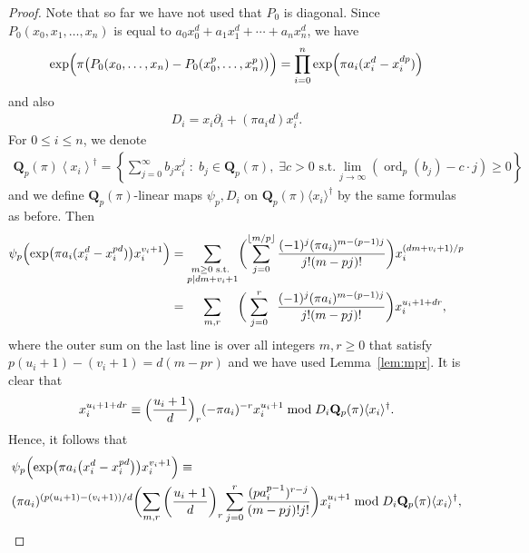 \documentclass[a4paper,11pt]{article}
\numberwithin{equation}{section}
\providecommand{\floor}[1]{\left\lfloor#1\right\rfloor}   %
\newcommand{\QQ}{\mathbf{Q}} %
\DeclareMathOperator{\ord}{ord}          %
\theoremstyle{definition}
\begin{document}
\begin{proof}
Note that so far we have not used that $P_0$ is diagonal. Since
$P_0(x_0, x_1, \dotsc, x_n)$ is equal to $a_0 x_0^d + a_1 x_1^d + \dotsb + a_n x_n^d$,
we have
\begin{align*}
\exp \Bigl(\pi \bigl(P_0(x_0,\ldots,x_n)- P_0(x_0^p,\ldots,x_n^p)\bigl) \Bigr) 
    = \prod_{i=0}^n \exp \Bigl( \pi a_i (x_i^d - x_i^{dp}) \Bigr)
\end{align*}
and also
\begin{align*}
D_i =x_i \partial_i + (\pi a_i d) x_i^d. 
\end{align*}
For $0 \leq i \leq n$, we denote
\begin{align*}
\QQ_p(\pi) \left\langle x_i \right\rangle^{\dag} =  \left\{ \sum_{j=0}^{\infty} b_j x_i^{j} \; : \; 
b_{j} \in \QQ_p(\pi), \; \exists c > 0 \text{ s.t.}  
\lim_{j \rightarrow \infty} \left(\ord_p(b_j) - c \cdot j \right) \geq 0 \right\}
\end{align*}
and we define $\QQ_p(\pi)$-linear maps $\psi_p, D_i$ on $\QQ_p(\pi) \langle x_i \rangle^{\dag}$ 
by the same formulas as before. Then
\begin{align*}
\psi_p \Bigl( \exp \bigl(\pi a_i(x_i^d- x_i^{pd})\bigr) x_i^{v_i+1} \Bigr) 
    & = \sum_{\substack{m \geq 0 \text{ s.t. }\\ p \mid dm+v_i+1}}
        \biggl(\sum_{j=0}^{\floor{m/p}} \frac{(-1)^j (\pi a_i)^{m-(p-1)j}}{j! (m-pj)!} \biggr) x_i^{(dm+v_i+1)/p} \\
    & = \sum_{\; \; \; \; \; \; m,r \; \; \; \; \; \;} 
        \biggl(\; \sum_{j=0}^{r} \; \; \frac{(-1)^j (\pi a_i)^{m-(p-1)j}}{j! (m-pj)!} \biggr) x_i^{u_i+1+dr},
\end{align*}
where the outer sum on the last line is over all integers $m, r \geq 0$ 
that satisfy $p(u_i+1)-(v_i+1)=d(m-pr)$ and we have used Lemma~\ref{lem:mpr}. 
It is clear that
\begin{equation*}
x_i^{u_i+1+dr} \equiv \Bigl(\frac{u_i+1}{d}\Bigr)_r (-\pi a_i)^{-r} x_i^{u_i+1} \bmod{D_i \QQ_p(\pi) \langle x_i \rangle^{\dag} }.
\end{equation*}
Hence, it follows that
\begin{align*}
&\psi_p \Bigl( \exp \bigl(\pi a_i \bigl( x_i^d- x_i^{pd} \bigr) \bigr) x_i^{v_i+1} \Bigr) \equiv \\
&(\pi a_i)^{(p (u_i + 1) - (v_i + 1))/d} 
    \biggl( \sum_{m,r} \left( \frac{u_i+1}{d} \right)_r 
        \sum_{j=0}^{r} \frac{(p a_i^{p-1})^{r-j}}{(m-pj)!j!} \biggr) x_i^{u_i+1} \bmod{D_i \QQ_p(\pi) \langle x_i \rangle^{\dag}},
\end{align*}

\end{proof}
\end{document}
